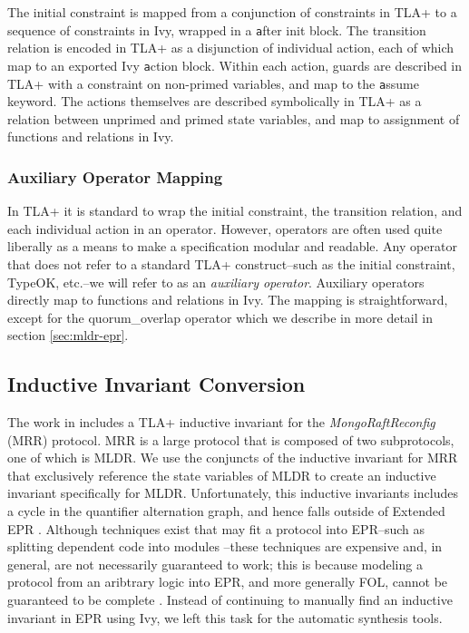 \documentclass[12pt]{article}
\newcommand{\ivy}[1]{{\footnotesize\texttt #1}}
\begin{document}
The initial constraint is mapped from a conjunction of constraints in TLA+ to a sequence of constraints in Ivy, wrapped in a \ivy{after init} block.  The transition relation is encoded in TLA+ as a disjunction of individual action, each of which map to an exported Ivy \ivy{action} block.  Within each action, guards are described in TLA+ with a constraint on non-primed variables, and map to the \ivy{assume} keyword.  The actions themselves are described symbolically in TLA+ as a relation between unprimed and primed state variables, and map to assignment of functions and relations in Ivy.

\subsubsection{Auxiliary Operator Mapping}


In TLA+ it is standard to wrap the initial constraint, the transition relation, and each individual action in an operator.  However, operators are often used quite liberally as a means to make a specification modular and readable.  Any operator that does not refer to a standard TLA+ construct--such as the initial constraint, TypeOK, etc.--we will refer to as an \textit{auxiliary operator}.  Auxiliary operators directly map to functions and relations in Ivy.  The mapping is straightforward, except for the quorum\_overlap operator which we describe in more detail in section \ref{sec:mldr-epr}.

\subsection{Inductive Invariant Conversion}

The work in \cite{schultz2021formal} includes a TLA+ inductive invariant for the \textit{MongoRaftReconfig} (MRR) protocol.  MRR is a large protocol that is composed of two subprotocols, one of which is MLDR.  We use the conjuncts of the inductive invariant for MRR that exclusively reference the state variables of MLDR to create an inductive invariant specifically for MLDR.  Unfortunately, this inductive invariants includes a cycle in the quantifier alternation graph, and hence falls outside of Extended EPR \cite{padonpaxosEPR}.  Although techniques exist that may fit a protocol into EPR--such as splitting dependent code into modules \cite{McMillan2018DeductiveVI}--these techniques are expensive and, in general, are not necessarily guaranteed to work; this is because modeling a protocol from an aribtrary logic into EPR, and more generally FOL, cannot be guaranteed to be complete \cite{padonpaxosEPR}.  Instead of continuing to manually find an inductive invariant in EPR using Ivy, we left this task for the automatic synthesis tools.
\end{document}

